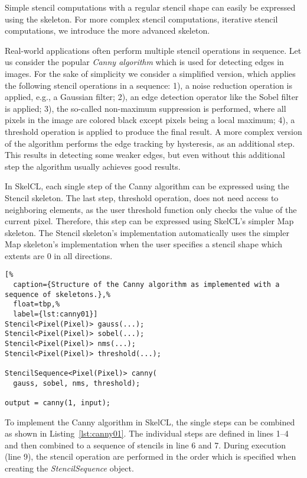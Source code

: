 Simple stencil computations with a regular stencil shape can easily be expressed using the \mapOverlap skeleton.
For more complex stencil computations, \eg iterative stencil computations, we introduce the more advanced \stencil skeleton.





Real-world applications often perform multiple stencil operations in sequence.
Let us consider the popular \emph{Canny algorithm} which is used for detecting edges in images.
For the sake of simplicity we consider a simplified version, which applies the following stencil operations in a sequence:
1), a noise reduction operation is applied, e.g., a Gaussian filter;
2), an edge detection operator like the Sobel filter is applied;
3), the so-called non-maximum suppression is performed, where all pixels in the image are colored black except pixels being a local maximum;
4), a threshold operation is applied to produce the final result.
A more complex version of the algorithm performs the edge tracking by hysteresis, as an additional step.
This results in detecting some weaker edges, but even without this additional step the algorithm usually achieves good results.

In SkelCL, each single step of the Canny algorithm can be expressed using the Stencil skeleton.
The last step, threshold operation, does not need access to neighboring elements, as the user threshold function only checks the value of the current pixel.
Therefore, this step can be expressed using SkelCL's simpler Map skeleton.
The Stencil skeleton's implementation automatically uses the simpler Map skeleton's implementation when the user specifies a stencil shape which extents are $0$ in all directions.

\begin{lstlisting}[%
  caption={Structure of the Canny algorithm as implemented with a sequence of skeletons.},%
  float=tbp,%
  label={lst:canny01}]
Stencil<Pixel(Pixel)> gauss(...);
Stencil<Pixel(Pixel)> sobel(...);
Stencil<Pixel(Pixel)> nms(...);
Stencil<Pixel(Pixel)> threshold(...);

StencilSequence<Pixel(Pixel)> canny(
  gauss, sobel, nms, threshold);

output = canny(1, input);
\end{lstlisting}

To implement the Canny algorithm in SkelCL, the single steps can be combined as shown in Listing~\ref{lst:canny01}.
The individual steps are defined in lines 1--4 and then combined to a sequence of stencils in line 6 and 7.
During execution (line 9), the stencil operation are performed in the order which is specified when creating the \emph{StencilSequence} object.

